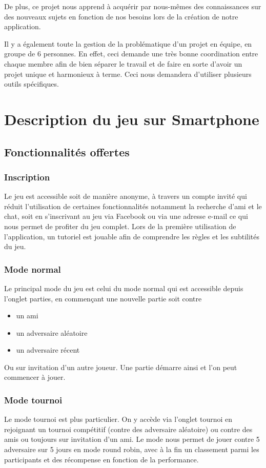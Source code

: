 \documentclass[a4paper,12pt]{article}
\begin{document}
	De plus, ce projet nous apprend à acquérir par nous-mêmes des connaissances sur des nouveaux sujets en fonction de nos besoins lors de la création de notre application. 
	
	Il y a également toute la gestion de la problématique d'un projet en équipe, en groupe de 6 personnes. En effet, ceci demande une très bonne coordination entre chaque membre afin de bien séparer le travail et de faire en sorte d'avoir un projet unique et harmonieux à terme. Ceci nous demandera d'utiliser plusieurs outils spécifiques.
	
	\section{Description du jeu sur Smartphone}
		\subsection{Fonctionnalités offertes}
			\subsubsection{Inscription}
			Le jeu est accessible soit de manière anonyme, à travers un compte invité qui réduit l'utilisation de certaines fonctionnalités notamment la recherche d'ami et le chat, soit en s'inscrivant au jeu via Facebook ou via une adresse e-mail ce qui nous permet de profiter du jeu complet.
			Lors de la première utilisation de l'application, un tutoriel est jouable afin de comprendre les règles et les subtilités du jeu.
			\subsubsection{Mode normal}
			Le principal mode du jeu est celui du mode normal qui est accessible		depuis l'onglet parties, en commençant une nouvelle partie soit contre
			\begin{itemize}
				\item un ami
				\item un adversaire aléatoire
				\item un adversaire récent
			\end{itemize}
			Ou sur invitation d'un autre joueur.
			Une partie démarre ainsi et l'on peut commencer à jouer.
			\subsubsection{Mode tournoi}
			Le mode tournoi est plus particulier. On y accède via l'onglet tournoi en rejoignant un tournoi compétitif (contre des adversaire aléatoire) ou contre des amis ou toujours sur invitation d'un ami.
			Le mode nous permet de jouer contre 5 adversaire sur 5 jours en mode round robin, avec à la fin un classement parmi les participants et des récompense en fonction de la performance.
\end{document}
